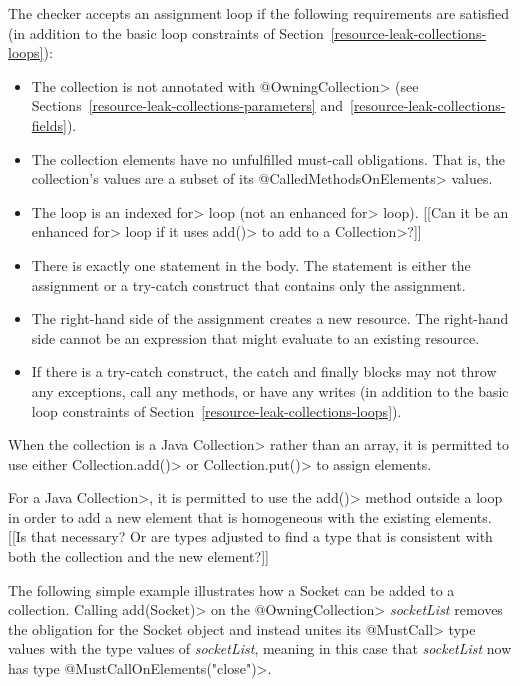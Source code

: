 The checker accepts an assignment loop if the following requirements are
satisfied (in addition to the basic loop constraints of Section~\ref{resource-leak-collections-loops}):

\begin{itemize}
  \item The collection is not annotated with \<@OwningCollection> (see
    Sections~\ref{resource-leak-collections-parameters} and~\ref{resource-leak-collections-fields}).
  \item The collection elements have no unfulfilled must-call obligations.  That
    is, the collection's \MustCallOnElements values are a subset of its
  \<@CalledMethodsOnElements> values.
  \item The loop is an indexed \<for> loop (not an enhanced \<for> loop). [[Can
    it be an enhanced \<for> loop if it uses \<add()> to add to a \<Collection>?]]
  \item There is exactly one statement in the body.  The statement is either the
    assignment or a try-catch construct that contains only the assignment.
  \item The right-hand side of the assignment creates a new resource.
    The right-hand side cannot be an expression that might evaluate to an existing resource.
  \item If there is a try-catch construct, the catch and finally blocks may
    not throw any exceptions, call any methods, or have any writes (in
    addition to the basic loop constraints of Section~\ref{resource-leak-collections-loops}).
\end{itemize}

When the collection is a Java \<Collection> rather than an array, it is
permitted to use either \<Collection.add()> or \<Collection.put()> to assign
elements.


For a Java \<Collection>, it is permitted to use the \<add()> method outside a
loop in order to add a new element that is homogeneous with the existing
elements.  [[Is that necessary?  Or are types adjusted to find a type that is
consistent with both the collection and the new element?]]

The following simple example illustrates how a Socket can be added to a collection. Calling \<add(Socket)> on the \<@OwningCollection> \textit{socketList} removes the obligation for the Socket object and instead unites its \<@MustCall> type values with the \MustCallOnElements type values of \textit{socketList}, meaning in this case that \textit{socketList} now has type  \<@MustCallOnElements({"close"})>.

